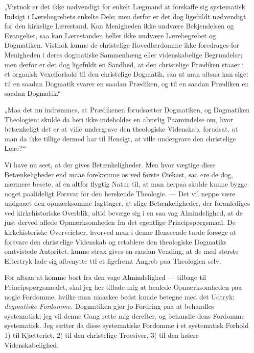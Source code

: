 \documentclass[12pt,a4paper]{book}
\newcommand{\opage}[1]{\marginnote{\footnotesize\textit{[#1]}}}
\begin{document}
„Vistnok er det ikke nødvendigt for enkelt Lægmand at forskaffe sig
systematisk Indsigt i Lærebegrebets enkelte Dele; men derfor er det dog
ligefuldt nødvendigt for den kirkelige Lærestand. Kan Menigheden ikke undvære
Bekjendelsen og Evangeliet, saa
\opage{114} kan Lærestanden heller ikke undvære Lærebegrebet og Dogmatiken. Vistnok kunne
de christelige Hovedlærdomme ikke foredrages for Menigheden i deres dogmatiske
Sammenhæng eller videnskabelige Begrundelse; men derfor er det dog ligefuldt en
Sandhed, at den christelige Prædiken staaer i et organisk Vexelforhold til den
christelige Dogmatik, saa at man altsaa kan sige: til en saadan Dogmatik svarer
en saadan Prædiken, og til en saadan Prædiken en saadan Dogmatik.“

„Maa det nu indrømmes, at Prædikenen forudsætter Dogmatiken, og Dogmatiken
Theologien: skulde da heri ikke indeholdes en alvorlig Paamindelse om, hvor
betænkeligt det er at ville undergrave den theologiske Videnskab, forudsat, at
man da ikke tillige dermed har til Hensigt, at ville undergrave den christelige
Lære?“

Vi have nu seet, at der gives Betænkeligheder. Men hvor vægtige disse
Betænkeligheder end maae forekomme os ved første Øiekast, saa ere de dog,
nærmere besete, af en altfor flygtig Natur til, at man herpaa skulde kunne
bygge noget paalideligt Forsvar for den herskende Theologie. --- Det vil neppe
være undgaaet den opmærksomme Iagttager, at slige Betænkeligheder, der
foranlediges ved kirkehistoriske Overblik, altid bevæge sig i en saa vag
Almindelighed, at de just derved aflede Opmærksomheden fra det egentlige
Principspørgsmaal. De kirkehistoriske Overveielser, hvorved man i denne
Henseende turde forsøge at forsvare den christelige Videnskab og retablere den
theologiske Dogmatiks omtvistede Autoritet, kunne strax gives en saadan
Vending, at de med største Eftertryk lade sig afbenytte ttl et ligefremt Angreb
paa Theologien selv.

For altsaa at komme bort fra den vage Almindelighed --- tilbage til
Principspørgsmaalet, skal jeg her tillade mig at henlede Opmærksomheden paa
nogle Fordomme, hvilke man maaskee bedst kunde betegne med det Udtryk:
\emph{dogmatiske Fordomme.}
\opage{115} Dogmatiken gjør jo Fordring paa at behandles systematisk; jeg vil denne Gang
rette mig derefter, og behandle dens Fordomme systematisk. Jeg sætter da disse
systematiske Fordomme i et systematisk Forhold 1) til Kjætteriet, 2) til den
christelige Troesiver, 3) til den høiere Videnskabelighed.
\end{document}
